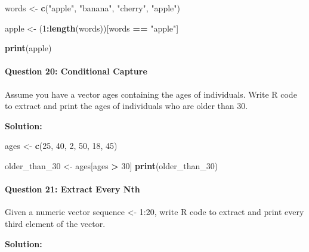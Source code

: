 \documentclass[
]{article}
\newenvironment{Shaded}{\begin{snugshade}}{\end{snugshade}}
\newcommand{\DecValTok}[1]{\textcolor[rgb]{0.00,0.00,0.81}{#1}}
\newcommand{\FunctionTok}[1]{\textcolor[rgb]{0.13,0.29,0.53}{\textbf{#1}}}
\newcommand{\NormalTok}[1]{#1}
\newcommand{\OtherTok}[1]{\textcolor[rgb]{0.56,0.35,0.01}{#1}}
\newcommand{\SpecialCharTok}[1]{\textcolor[rgb]{0.81,0.36,0.00}{\textbf{#1}}}
\newcommand{\StringTok}[1]{\textcolor[rgb]{0.31,0.60,0.02}{#1}}
\begin{document}
\begin{Shaded}
\begin{Highlighting}[]
\NormalTok{words }\OtherTok{\textless{}{-}} \FunctionTok{c}\NormalTok{(}\StringTok{"apple"}\NormalTok{, }\StringTok{"banana"}\NormalTok{, }\StringTok{"cherry"}\NormalTok{, }\StringTok{"apple"}\NormalTok{)}

\NormalTok{apple }\OtherTok{\textless{}{-}}\NormalTok{ (}\DecValTok{1}\SpecialCharTok{:}\FunctionTok{length}\NormalTok{(words))[words }\SpecialCharTok{==} \StringTok{"apple"}\NormalTok{]}

\FunctionTok{print}\NormalTok{(apple)}
\end{Highlighting}
\end{Shaded}

\hypertarget{question-20-conditional-capture}{%
\paragraph{Question 20: Conditional
Capture}\label{question-20-conditional-capture}}

Assume you have a vector ages containing the ages of individuals. Write
R code to extract and print the ages of individuals who are older than
30.

\textbf{Solution:}

\begin{Shaded}
\begin{Highlighting}[]
\NormalTok{ages }\OtherTok{\textless{}{-}} \FunctionTok{c}\NormalTok{(}\DecValTok{25}\NormalTok{, }\DecValTok{40}\NormalTok{, }\DecValTok{2}\NormalTok{, }\DecValTok{50}\NormalTok{, }\DecValTok{18}\NormalTok{, }\DecValTok{45}\NormalTok{)}

\NormalTok{older\_than\_30 }\OtherTok{\textless{}{-}}\NormalTok{ ages[ages }\SpecialCharTok{\textgreater{}} \DecValTok{30}\NormalTok{]}
\FunctionTok{print}\NormalTok{(older\_than\_30)}
\end{Highlighting}
\end{Shaded}

\hypertarget{question-21-extract-every-nth}{%
\paragraph{Question 21: Extract Every
Nth}\label{question-21-extract-every-nth}}

Given a numeric vector sequence \textless- 1:20, write R code to extract
and print every third element of the vector.

\textbf{Solution:}
\end{document}
